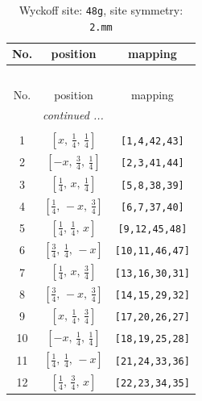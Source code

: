 \documentclass[fleqn,8pt]{jsarticle}
\begin{document}
\begin{longtable}{ccc}
\caption{Wyckoff site: {\tt 48g}, site symmetry: {\tt 2.mm}}
 \\
 \hline \hline
No. & position & mapping \\ \hline \endfirsthead

\multicolumn{2}{l}{\tablename\ \thetable{}} \\
 \hline \hline
No. & position & mapping \\ \hline \endhead

 \hline \hline
\multicolumn{2}{r}{\footnotesize\it continued ...} \\ \endfoot

 \hline \hline
\multicolumn{2}{r}{} \\ \endlastfoot

1 & $\left[ x,\, \frac{1}{4},\, \frac{1}{4} \right]$ & {\tt [1,4,42,43]} \\ \hline
2 & $\left[ - x,\, \frac{3}{4},\, \frac{1}{4} \right]$ & {\tt [2,3,41,44]} \\ \hline
3 & $\left[ \frac{1}{4},\, x,\, \frac{1}{4} \right]$ & {\tt [5,8,38,39]} \\ \hline
4 & $\left[ \frac{1}{4},\, - x,\, \frac{3}{4} \right]$ & {\tt [6,7,37,40]} \\ \hline
5 & $\left[ \frac{1}{4},\, \frac{1}{4},\, x \right]$ & {\tt [9,12,45,48]} \\ \hline
6 & $\left[ \frac{3}{4},\, \frac{1}{4},\, - x \right]$ & {\tt [10,11,46,47]} \\ \hline
7 & $\left[ \frac{1}{4},\, x,\, \frac{3}{4} \right]$ & {\tt [13,16,30,31]} \\ \hline
8 & $\left[ \frac{3}{4},\, - x,\, \frac{3}{4} \right]$ & {\tt [14,15,29,32]} \\ \hline
9 & $\left[ x,\, \frac{1}{4},\, \frac{3}{4} \right]$ & {\tt [17,20,26,27]} \\ \hline
10 & $\left[ - x,\, \frac{1}{4},\, \frac{1}{4} \right]$ & {\tt [18,19,25,28]} \\ \hline
11 & $\left[ \frac{1}{4},\, \frac{1}{4},\, - x \right]$ & {\tt [21,24,33,36]} \\ \hline
12 & $\left[ \frac{1}{4},\, \frac{3}{4},\, x \right]$ & {\tt [22,23,34,35]} \\
\end{longtable}
\renewcommand{\arraystretch}{1.2}
\end{document}
